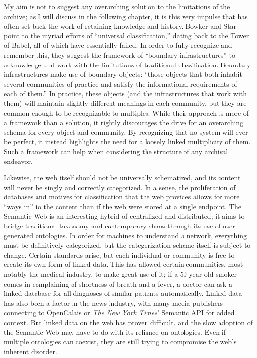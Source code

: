 My aim is not to suggest any overarching solution to the limitations of the archive; as I will discuss in the following chapter, it is this very impulse that has often set back the work of retaining knowledge and history. Bowker and Star point to the myriad efforts of ``universal classification,'' dating back to the Tower of Babel, all of which have essentially failed. In order to fully recognize and remember this, they suggest the framework of ``boundary infrastructures'' to acknowledge and work with the limitations of traditional classification. Boundary infrastructures make use of boundary objects: ``those objects that both inhabit several communities of practice and satisfy the informational requirements of each of them.''\autocite[297]{bowker_sorting_2000} In practice, these objects (and the infrastructures that work with them) will maintain slightly different meanings in each community, but they are common enough to be recognizable to multiples. While their approach is more of a framework than a solution, it rightly discourages the drive for an overarching schema for every object and community. By recognizing that no system will ever be perfect, it instead highlights the need for a loosely linked multiplicity of them. Such a framework can help when considering the structure of any archival endeavor.

Likewise, the web itself should not be universally schematized, and its content will never be singly and correctly categorized. In a sense, the proliferation of databases and motives for classification that the web provides allows for more ``ways in'' to the content than if the web were stored at a single endpoint. The Semantic Web is an interesting hybrid of centralized and distributed; it aims to bridge traditional taxonomy and contemporary chaos through its use of user-generated ontologies. In order for machines to understand a network, everything must be definitively categorized, but the categorization scheme itself is subject to change. Certain standards arise, but each individual or community is free to create its own form of linked data. This has allowed certain communities, most notably the medical industry, to make great use of it; if a 50-year-old smoker comes in complaining of shortness of breath and a fever, a doctor can ask a linked database for all diagnoses of similar patients automatically. Linked data has also been a factor in the news industry, with many media publishers connecting to OpenCalais or \emph{The New  York Times}' Semantic API for added context. But linked data on the web has proven difficult, and the slow adoption of the Semantic Web may have to do with its reliance on ontologies. Even if multiple ontologies can coexist, they are still trying to compromise the web's inherent disorder.

